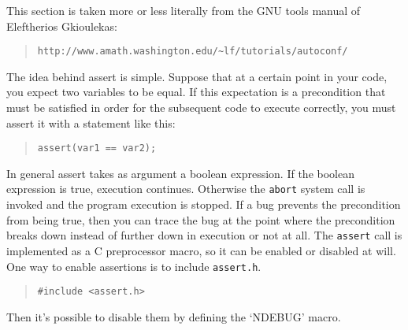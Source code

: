 %
%
%
%
%


 \label{sec:development:assert}

This section is taken more or less literally from the GNU tools manual
of Eleftherios Gkioulekas:
\begin{quote}
{\footnotesize
\verb|http://www.amath.washington.edu/~lf/tutorials/autoconf/|}
\end{quote}

The idea behind assert is simple. Suppose that at a certain point in
your code, you expect two variables to be equal.  If this expectation
is a precondition that must be satisfied in order for the subsequent
code to execute correctly, you must assert it with a statement like
this:
\begin{quote}
\verb|assert(var1 == var2);|
\end{quote}

In general assert takes as argument a boolean expression. If the
boolean expression is true, execution continues. Otherwise the
\verb|abort| system call is invoked and the program execution is
stopped. If a bug prevents the precondition from being true, then you
can trace the bug at the point where the precondition breaks down
instead of further down in execution or not at all.  The \verb|assert| call
is implemented as a C preprocessor macro, so it can be enabled or
disabled at will. One way to enable assertions is to include
\verb|assert.h|.
\begin{quote}
  \verb|#include <assert.h>|
\end{quote}
Then it's possible to disable them by defining the `NDEBUG' macro.

%
%

